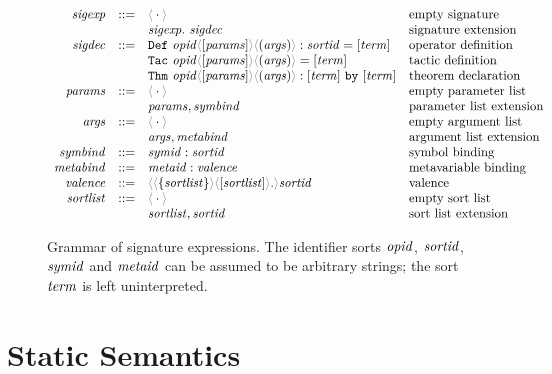 \documentclass{report}
\begin{document}
\begin{figure}[H]
  \begin{displaymath}
    \begin{array}{rcll}
       \SortSigExpr & ::=
         & \EmptySig & \text{empty signature}\\
         && \ExtendSig{\SortSigExpr}{\SortSigDecl} & \text{signature extension}\\
       \SortSigDecl & ::=
         & \DefDecl{\SortOpId}{\SortParams}{\SortArgs}{\SortSortId}{\SortTerm} & \text{operator definition}\\
         && \TacDecl{\SortOpId}{\SortParams}{\SortArgs}{\SortTerm} & \text{tactic definition}\\
         && \ThmDecl{\SortOpId}{\SortParams}{\SortArgs}{\SortTerm}{\SortTerm} & \text{theorem declaration}\\
       \SortParams & ::=
         & \EmptyCtx & \text{empty parameter list}\\
         && \ExtendCtx{\SortParams}{\SortSymBind} & \text{parameter list extension}\\
       \SortArgs & ::=
         & \EmptyCtx & \text{empty argument list}\\
         && \ExtendCtx{\SortArgs}{\SortMetaBind}  & \text{argument list extension}\\
       \SortSymBind & ::=
         & \Bind{\SortSymId}{\SortSortId} & \text{symbol binding}\\
       \SortMetaBind & ::=
         & \Bind{\SortMetaId}{\SortValence} & \text{metavariable binding}\\
       \SortValence & ::=
         & \Valence{\SortSortList}{\SortSortList}{\SortSortId} & \text{valence}\\
       \SortSortList & ::=
         & \EmptyCtx & \text{empty sort list}\\
         && \ExtendCtx{\SortSortList}{\SortSortId} & \text{sort list extension}
     \end{array}
  \end{displaymath}

  \caption{%
    Grammar of signature expressions. The identifier sorts $\mathit{opid}$,
    $\mathit{sortid}$, $\mathit{symid}$ and $\mathit{metaid}$ can be assumed to be arbitrary
    strings; the sort $\mathit{term}$ is left uninterpreted.%
  }
  \label{fig:sig-grammar}
\end{figure}

\section{Static Semantics}
\label{sec:sig-statics}
\end{document}
